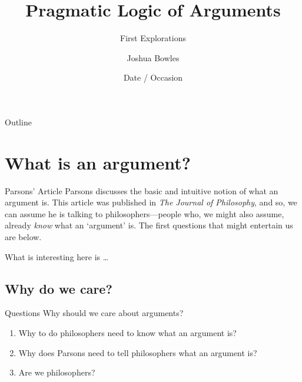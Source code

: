 \documentclass{beamer}
\title%
{Pragmatic Logic of Arguments}
\subtitle
{First Explorations} %
\author{Joshua Bowles}
\institute{Department of English \\ Utah Valley University}
\date[Short Occasion] %
{Date / Occasion}
\begin{document}


\begin{frame}
  \titlepage
\end{frame}

\begin{frame}{Outline}
  \tableofcontents
\end{frame}




\section{What is an argument?}

\begin{frame}{Parsons' Article}
Parsons discusses the basic and intuitive notion of what an argument is. This article was published in \textsl{The Journal of Philosophy}, and so, we can assume he is talking to philosophers---people who, we might also assume, already \textsl{know} what an `argument' is. The first questions that might entertain us are below. 
\end{frame} 


What is interesting here is \ldots

\subsection{Why do we care?}
\begin{frame}{Questions}\label{whycare}
Why should we care about arguments?
\begin{enumerate}
\item Why to do philosophers need to know what an argument is?
\item Why does Parsons need to tell philosophers what an argument is? 
\item Are we philosophers?
\end{enumerate}
\end{frame}
\end{document}
